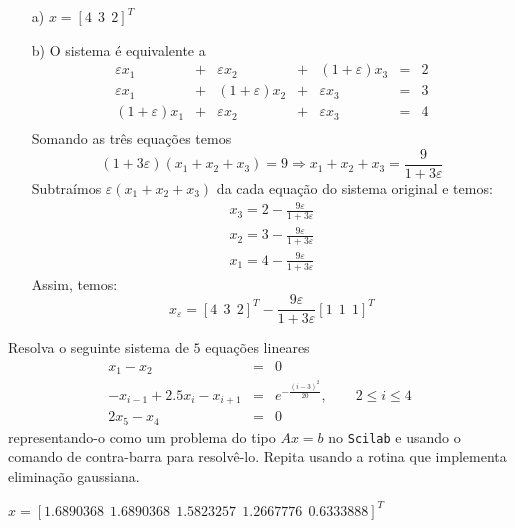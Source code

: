 \begin{resp}
  
\begin{itemize}
\item[a)] $x=[4 ~~3 ~~2]^T$

\item[b)] O sistema é equivalente a
$$
\begin{array}{lclclcl}
\varepsilon x_1 &+& \varepsilon x_2 &+&(1+\varepsilon) x_3 &=& 2\\
\varepsilon x_1 &+& (1+\varepsilon) x_2 &+&\varepsilon x_3 &=& 3\\
(1+\varepsilon) x_1 &+& \varepsilon x_2 &+&\varepsilon x_3 &=& 4\\
\end{array}
$$
Somando as três equações temos
$$(1+3\varepsilon)(x_1+x_2+x_3)=9\Longrightarrow x_1+x_2+x_3=\frac{9}{1+3\varepsilon}$$
Subtraímos $\varepsilon(x_1+x_2+x_3)$ da cada equação do sistema original e temos:
$$\begin{array}{l}
x_3=2-\frac{9\varepsilon}{1+3\varepsilon}\\
x_2=3-\frac{9\varepsilon}{1+3\varepsilon}\\
x_1=4-\frac{9\varepsilon}{1+3\varepsilon}
\end{array}
$$
Assim, temos:
$$x_{\varepsilon}=\left[4 ~~3 ~~2\right]^T-\frac{9\varepsilon}{1+3\varepsilon}\left[1 ~~1 ~~1\right]^T$$
\end{itemize}
      
\end{resp}
\fi

\ifisscilab
\begin{exer}\label{exer:trid} Resolva o seguinte sistema de $5$ equações lineares
\begin{eqnarray*}
x_1-x_2&=&0\\
-x_{i-1}+2.5x_i-x_{i+1}&=&e^{-\frac{(i-3)^2}{20}},\qquad 2\leq i \leq 4\\
2x_{5}-x_{4}&=&0
\end{eqnarray*}
representando-o como um problema do tipo $Ax=b$ no \verb+Scilab+ e usando o comando de contra-barra para resolvê-lo. Repita usando a rotina que implementa eliminação gaussiana.
\end{exer}
\begin{resp}
 $x=[ 1.6890368  ~~  1.6890368  ~~  1.5823257  ~~  1.2667776   ~~ 0.6333888]^{T}$    
\end{resp}
\fi

